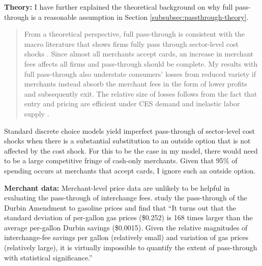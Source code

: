 \documentclass[main.tex]{subfiles}
\begin{document}
{    \textbf{Theory: } I have further explained the theoretical background on why full pass-through is a reasonable assumption in Section \ref{subsubsec:passthrough-theory}.
    \begin{quotation}
        From a theoretical perspective, full pass-through is consistent with the macro literature that shows firms fully pass through sector-level cost shocks \parencite{Amiti.etal2019}.
Since almost all merchants accept cards, an increase in merchant fees affects all firms and pass-through should be complete.
        My results with full pass-through also understate consumers' losses from reduced variety if merchants instead absorb the merchant fees in the form of lower profits and subsequently exit.
The relative size of losses follows from the fact that entry and pricing are efficient under CES demand and inelastic labor supply \parencite{Dhingra.Morrow2019}.
    \end{quotation}

    Standard discrete choice models yield imperfect pass-through of sector-level cost shocks when there is a substantial substitution to an outside option that is not affected by the cost shock.
For this to be the case in my model, there would need to be a large competitive fringe of cash-only merchants.
Given that 95\% of spending occurs at merchants that accept cards, I ignore such an outside option.

    \textbf{Merchant data:} Merchant-level price data are unlikely to be helpful in evaluating the pass-through of interchange fees.
\textcite{Mukharlyamov.Sarin2025} study the pass-through of the Durbin Amendment to gasoline prices and find that ``It turns out that the standard deviation of per-gallon gas prices (\$0.252) is 168 times larger than the average per-gallon Durbin savings (\$0.0015).
Given the relative magnitudes of interchange-fee savings per gallon (relatively small) and variation of gas prices (relatively large), it is virtually impossible to quantify the extent of pass-through with statistical significance.''
}
\end{document}

